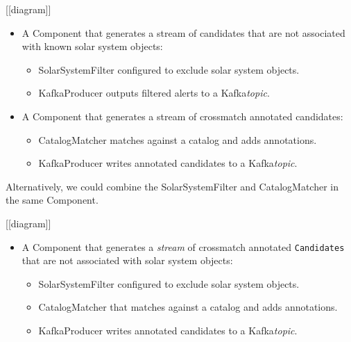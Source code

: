 \documentclass{article}
\newcommand{\kafka} {Kafka\xspace}
\newcommand{\kftopic} {\textit{topic}\xspace}
\newcommand{\kfstream} {\textit{stream}\xspace}
\newcommand{\crossmatch} {crossmatch\xspace}
\newcommand{\javaname}[1] {{\ttfamily\color{codeblue} #1}}
\begin{document}
[[diagram]]
\begin{itemize}
    \item A \javaname{Component} that generates a stream of candidates that are not associated with known solar system objects:
    \begin{itemize}
        \item \javaname{SolarSystemFilter} configured to exclude solar system objects.
    \end{itemize}
    \begin{itemize}
        \item \javaname{KafkaProducer} outputs filtered alerts to a \kafka \kftopic.
    \end{itemize}
\end{itemize}

\begin{itemize}
    \item A \javaname{Component} that generates a stream of \crossmatch annotated candidates:
    \begin{itemize}
        \item \javaname{CatalogMatcher} matches against a catalog and adds annotations.
    \end{itemize}
    \begin{itemize}
        \item \javaname{KafkaProducer} writes annotated candidates to a \kafka \kftopic.
    \end{itemize}
\end{itemize}

Alternatively, we could combine the \javaname{SolarSystemFilter} and \javaname{CatalogMatcher} in the same \javaname{Component}.

[[diagram]]
\begin{itemize}
    \item A \javaname{Component} that generates a \kfstream of \crossmatch annotated \texttt{Candidates} that are not associated with solar system objects:
    \begin{itemize}
        \item \javaname{SolarSystemFilter} configured to exclude solar system objects.
    \end{itemize}
    \begin{itemize}
        \item \javaname{CatalogMatcher} that matches against a catalog and adds annotations.
    \end{itemize}
    \begin{itemize}
        \item \javaname{KafkaProducer} writes annotated candidates to a \kafka \kftopic.
    \end{itemize}
\end{itemize}
\end{document}
